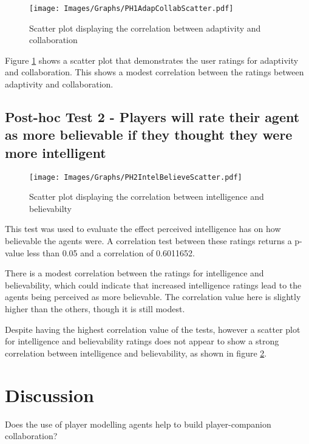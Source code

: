 \documentclass{IEEEtran}
\begin{document}
\begin{figure}[!h]
  \centering
  \texttt{[image: Images/Graphs/PH1AdapCollabScatter.pdf]}
  
\caption{Scatter plot displaying the correlation between adaptivity and collaboration}
\label{fig:PH1AdapCollabScatter}
\end{figure}

Figure \ref{fig:PH1AdapCollabScatter} shows a scatter plot that demonstrates the user ratings for adaptivity and collaboration. This shows a modest correlation between the ratings between adaptivity and collaboration.

\subsection{Post-hoc Test 2 - Players will rate their agent as more believable if they thought they were more intelligent}

\begin{figure}[!h]
  \centering
  \texttt{[image: Images/Graphs/PH2IntelBelieveScatter.pdf]}
  
\caption{Scatter plot displaying the correlation between intelligence and believabilty}
\label{fig:PH2IntelBelieveScatter}
\end{figure}

This test was used to evaluate the effect perceived intelligence has on how believable the agents were. A correlation test between these ratings returns a p-value less than 0.05 and a correlation of 0.6011652.

There is a modest correlation between the ratings for intelligence and believability, which could indicate that increased intelligence ratings lead to the agents being perceived as more believable. The correlation value here is slightly higher than the others, though it is still modest.

Despite having the highest correlation value of the tests, however a scatter plot for intelligence and believability ratings does not appear to show a strong correlation between intelligence and believability, as shown in figure \ref{fig:PH2IntelBelieveScatter}.

\section{Discussion}
\label{Discussion}

Does the use of player modelling agents help to build player-companion collaboration?
\end{document}

